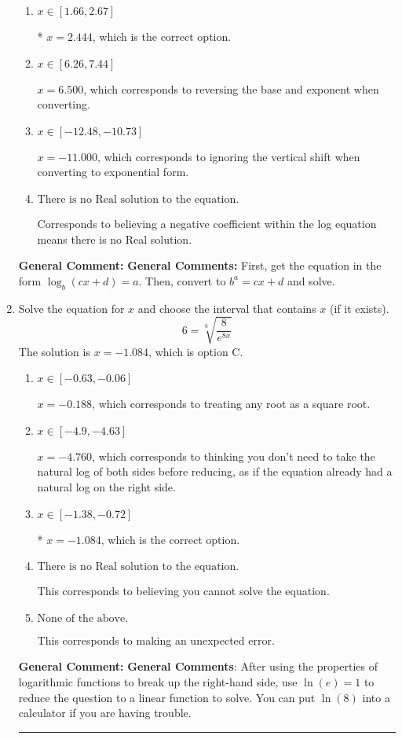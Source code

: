 \documentclass{extbook}[14pt]
\newcommand{\litem}[1]{\item #1

\rule{\textwidth}{0.4pt}}
\begin{document}
\begin{enumerate}
{\begin{enumerate}[label=\Alph*.]
$x = 1.500$, which corresponds to reversing the base and exponent when converting and reversing the value with $x$.
\item \( x \in [1.66, 2.67] \)

* $x = 2.444$, which is the correct option.
\item \( x \in [6.26, 7.44] \)

$x = 6.500$, which corresponds to reversing the base and exponent when converting.
\item \( x \in [-12.48, -10.73] \)

$x = -11.000$, which corresponds to ignoring the vertical shift when converting to exponential form.
\item \( \text{There is no Real solution to the equation.} \)

Corresponds to believing a negative coefficient within the log equation means there is no Real solution.
\end{enumerate}

\textbf{General Comment:} \textbf{General Comments:} First, get the equation in the form $\log_b{(cx+d)} = a$. Then, convert to $b^a = cx+d$ and solve.
}
\litem{
 Solve the equation for $x$ and choose the interval that contains $x$ (if it exists).
\[  6 = \sqrt[6]{\frac{8}{e^{8x}}} \]
The solution is \( x = -1.084 \), which is option C.\begin{enumerate}[label=\Alph*.]
\item \( x \in [-0.63, -0.06] \)

$x = -0.188$, which corresponds to treating any root as a square root.
\item \( x \in [-4.9, -4.63] \)

$x = -4.760$, which corresponds to thinking you don't need to take the natural log of both sides before reducing, as if the equation already had a natural log on the right side.
\item \( x \in [-1.38, -0.72] \)

* $x = -1.084$, which is the correct option.
\item \( \text{There is no Real solution to the equation.} \)

This corresponds to believing you cannot solve the equation.
\item \( \text{None of the above.} \)

This corresponds to making an unexpected error.
\end{enumerate}

\textbf{General Comment:} \textbf{General Comments}: After using the properties of logarithmic functions to break up the right-hand side, use $\ln(e) = 1$ to reduce the question to a linear function to solve. You can put $\ln(8)$ into a calculator if you are having trouble.
}
\end{enumerate}
\end{document}
